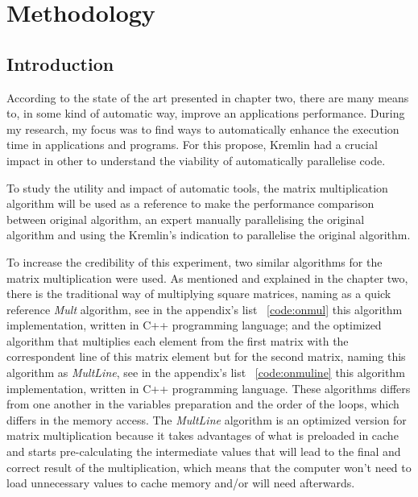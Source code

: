 \chapter{Methodology}\label{chap:chap4}

\section*{}



\section{Introduction}

According to the state of the art presented in chapter two, there are many means to, in some kind of automatic way, improve an applications performance. During my research, my focus was to find ways to automatically enhance the execution time in applications and programs. For this propose, Kremlin had a crucial impact in other to understand the viability of automatically parallelise code.

To study the utility and impact of automatic tools, the matrix multiplication algorithm will be used as a reference to make the performance comparison between original algorithm, an expert manually parallelising the original algorithm and using the Kremlin's indication to parallelise the original algorithm.

To increase the credibility of this experiment, two similar algorithms for the matrix multiplication were used. As mentioned and explained in the chapter two, there is the traditional way of multiplying square matrices, naming as a quick reference \textit{Mult} algorithm, see in the appendix's list ~\ref{code:onmul} this algorithm implementation, written in C++ programming language; and the optimized algorithm that multiplies each element from the first matrix with the correspondent line of this matrix element but for the second matrix, naming this algorithm as \textit{MultLine}, see in the appendix's list ~\ref{code:onmuline} this algorithm implementation, written in C++ programming language. These algorithms differs from one another in the variables preparation and the order of the loops, which differs in the memory access. The \textit{MultLine} algorithm is an optimized version for matrix multiplication because it takes advantages of what is preloaded in cache and starts pre-calculating the intermediate values that will lead to the final and correct result of the multiplication, which means that the computer won't need to load unnecessary values to cache memory and/or will need afterwards.  

